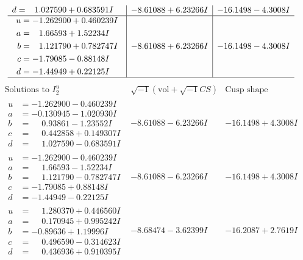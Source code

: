 \documentclass[1p]{elsarticle_modified}
\theoremstyle{definition}
\newcommand{\I}{\sqrt{-1}}
\begin{document}
$$\begin{array}{c|c|c}
\begin{aligned}
d &= \phantom{-}1.027590 + 0.683591 I\end{aligned}
 & -8.61088 + 6.23266 I & -16.1498 - 4.3008 I \\ \hline\begin{aligned}
u &= -1.262900 + 0.460239 I \\
a &= \phantom{-}1.66593 + 1.52234 I \\
b &= \phantom{-}1.121790 + 0.782747 I \\
c &= -1.79085 - 0.88148 I \\
d &= -1.44949 + 0.22125 I\end{aligned}
 & -8.61088 + 6.23266 I & -16.1498 - 4.3008 I\\
 \hline 
 \end{array}$$\newpage$$\begin{array}{c|c|c}  
\text{Solutions to }I^u_{2}& \I (\text{vol} + \sqrt{-1}CS) & \text{Cusp shape}\\
 \hline 
\begin{aligned}
u &= -1.262900 - 0.460239 I \\
a &= -0.130945 - 1.020930 I \\
b &= \phantom{-}0.93861 - 1.23552 I \\
c &= \phantom{-}0.442858 + 0.149307 I \\
d &= \phantom{-}1.027590 - 0.683591 I\end{aligned}
 & -8.61088 - 6.23266 I & -16.1498 + 4.3008 I \\ \hline\begin{aligned}
u &= -1.262900 - 0.460239 I \\
a &= \phantom{-}1.66593 - 1.52234 I \\
b &= \phantom{-}1.121790 - 0.782747 I \\
c &= -1.79085 + 0.88148 I \\
d &= -1.44949 - 0.22125 I\end{aligned}
 & -8.61088 - 6.23266 I & -16.1498 + 4.3008 I \\ \hline\begin{aligned}
u &= \phantom{-}1.280370 + 0.446560 I \\
a &= \phantom{-}0.170945 + 0.995242 I \\
b &= -0.89636 + 1.19996 I \\
c &= \phantom{-}0.496590 - 0.314623 I \\
d &= \phantom{-}0.436936 + 0.910395 I\end{aligned}
 & -8.68474 - 3.62399 I & -16.2087 + 2.7619 I \\ \hline\begin{aligned}

\end{aligned}
\end{array}$$
\end{document}
